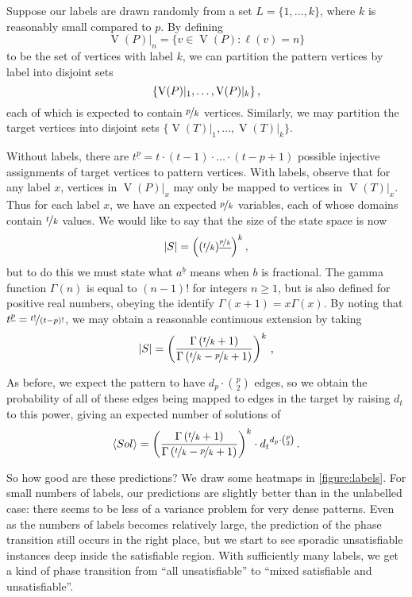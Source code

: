 \documentclass[twoside,11pt]{article}
\begin{document}
Suppose our labels are drawn randomly from a set $L = \{ 1, \ldots, k \}$, where $k$ is reasonably
small compared to $p$. By defining \[ \operatorname{V}(P)\vert_n = \{ v \in \operatorname{V}(P) :
\ell(v) = n \} \] to be the set of vertices with label $k$, we can partition the pattern
vertices by label into disjoint sets \[\{ \operatorname{V}(P)\vert_1, \ldots,
\operatorname{V}(P)\vert_k \}\textnormal{\,,}\] each of which is expected to contain
$\nicefrac{p}{k}$ vertices. Similarly, we may partition the target vertices into disjoint
sets $\{ \operatorname{V}(T)\vert_1, \ldots, \operatorname{V}(T)\vert_k \}$.

Without labels, there are $t^{\underline{p}} = t \cdot (t - 1) \cdot \ldots \cdot (t - p + 1)$
possible injective assignments of target vertices to pattern vertices.  With labels, observe that
for any label $x$, vertices in $\operatorname{V}(P)|_x$ may only be mapped to vertices in
$\operatorname{V}(T)|_x$.  Thus for each label $x$, we have an expected $\nicefrac{p}{k}$ variables,
each of whose domains contain $\nicefrac{t}{k}$ values. We would like to say that the size of the
state space is now \[ |S| = \left((\nicefrac{t}{k})^{\underline{\nicefrac{p}{k}}}\right)^{k}
\textnormal{,} \] but to do this we must state what $a^{\underline{b}}$ means when $b$ is
fractional. The gamma function $\Gamma(n)$ is equal to $(n - 1)!$ for integers $n \ge 1$, but is also
defined for positive real numbers, obeying the identify $\Gamma(x + 1) = x\Gamma(x)$. By noting that
$t^{\underline{p}} = \nicefrac{t!}{(t - p)!}$, we may obtain a reasonable
continuous extension by taking \[ |S| = \left(\frac{\Gamma\left(\nicefrac{t}{k} +
1\right)}{\Gamma\left(\nicefrac{t}{k} - \nicefrac{p}{k} + 1\right)}\right)^{k} \textnormal{\,,} \]

As before, we expect the pattern to have $d_p \cdot \binom{p}{2}$ edges, so we obtain the
probability of all of these edges being mapped to edges in the target by raising $d_t$ to this
power, giving an expected number of solutions of \begin{equation} \langle Sol \rangle = \left(
    \frac{\Gamma\left(\nicefrac{t}{k} + 1\right)}{\Gamma\left(\nicefrac{t}{k} - \nicefrac{p}{k} +
1\right)} \right)^{k}  \cdot
{d_t}^{d_p \cdot \binom{p}{2}} \textnormal{\,.} \end{equation}

So how good are these predictions? We draw some heatmaps in \cref{figure:labels}. For small numbers
of labels, our predictions are slightly better than in the unlabelled case: there seems to be less
of a variance problem for very dense patterns. Even as the numbers of labels becomes relatively
large, the prediction of the phase transition still occurs in the right place, but we start to see
sporadic unsatisfiable instances deep inside the satisfiable region. With sufficiently many labels,
we get a kind of phase transition from ``all unsatisfiable'' to ``mixed satisfiable and
unsatisfiable''.
\end{document}
